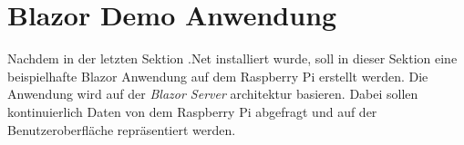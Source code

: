 \section{Blazor Demo Anwendung}
\label{sec:blazordemo}
Nachdem in der letzten Sektion \emph{} .Net installiert wurde, soll in
dieser Sektion eine beispielhafte Blazor Anwendung auf dem Raspberry Pi erstellt werden. Die
Anwendung wird auf der \emph{Blazor Server} architektur basieren. Dabei sollen kontinuierlich
Daten von dem Raspberry Pi abgefragt und auf der Benutzeroberfläche repräsentiert werden.



